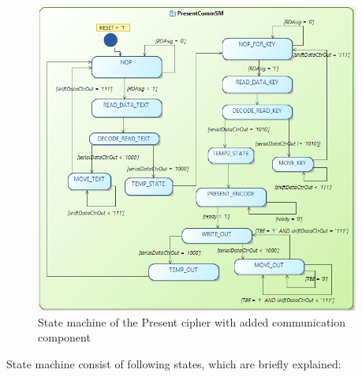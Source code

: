 \documentclass{gajewski}
\begin{document}
\begin{figure}[!ht]%
    \begin{center}
    \includegraphics[width=0.95\textwidth]{img/PresentCommSM.png}
    \caption{%
        State machine of the Present cipher with added communication component
     }%
    \label{presentCommSM}
    \end{center}
 \end{figure}


State machine consist of following states, which are briefly explained:
\end{document}
